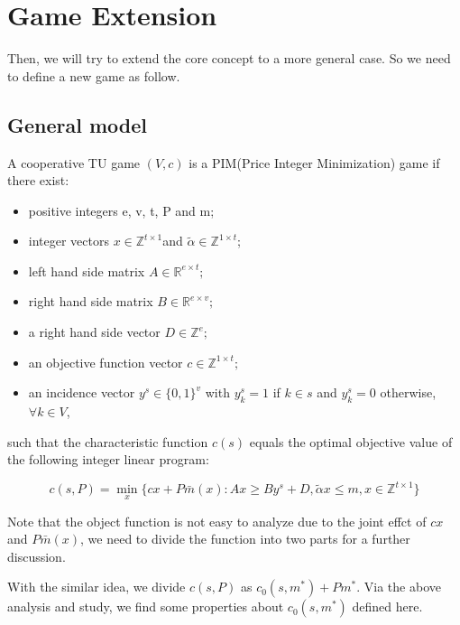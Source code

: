 \section{Game Extension}

Then, we will try to extend the core concept to a more general case. So we need to define a new game as follow.

\subsection*{General model}

A cooperative TU game $(V,c)$ is a PIM(Price Integer Minimization) game if there exist:

\begin{itemize}
	\item positive integers e, v, t, P and m;
	\item integer vectors $ x \in \mathbb{Z}^{t \times 1} $and $ \tilde{\alpha} \in \mathbb{Z}^{1 \times t} $;
	\item left hand side matrix  $A \in \mathbb{R} ^{e \times t};$
	\item right hand side matrix $B \in \mathbb{R} ^ {e \times v};$
	\item a right hand side vector $D \in \mathbb{Z} ^ {e};$
	\item an objective function vector
	$c \in \mathbb{Z}^{1 \times t};$
	\item an incidence vector $y^s \in \{0,1\}^v$ with $y^s_k = 1$ if $k \in s$ and $y^s_k = 0 $ otherwise, $\forall k \in V$,

\end{itemize}

such that the characteristic function $c(s)$ equals the optimal objective value of the following integer linear program:

\[
c(s,P)= \mathop{\min}_{x} \{ cx+P\bar{m}(x): Ax \geq By^s+D, \tilde{\alpha}x \leq m, x \in \mathbb{Z}^{t \times 1} \}
\]

Note that the object function is not easy to analyze due to the joint effct of $cx$ and $P\bar{m}(x)$, we need to divide the function into two parts for a further discussion.

With the similar idea, we divide $c(s,P)$ as $c_0(s,m^*) + Pm^*$. Via the above analysis and study, we find some properties about $c_0(s,m^*)$ defined here.

